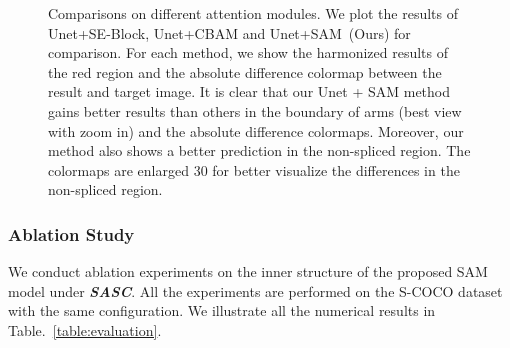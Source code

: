 \begin{figure}[h]
\centering   
{}

\par\bigskip\vspace*{-2em}


\par\bigskip\vspace*{-2em}
\addtocounter{subfigure}{-3}


\caption{Comparisons on different attention modules. We plot the results of Unet+SE-Block, Unet+CBAM and Unet+SAM~(Ours) for comparison. For each method, we show the harmonized results of the red region and the absolute difference colormap between the result and target image. It is clear that our Unet + SAM method gains better results than others in the boundary of arms (best view with zoom in) and the absolute difference colormaps. Moreover, our method also shows a better prediction in the non-spliced region. The colormaps are enlarged 30 for better visualize the differences in the non-spliced region.}
\label{fig:attentionmodule}
\vspace{-1.5em}
\end{figure}
 

\subsubsection{Ablation Study}
\label{sec:astudy}
We conduct ablation experiments on the inner structure of the proposed SAM model under \textit{\textbf{SASC}}. All the experiments are performed on the S-COCO dataset with the same configuration. We illustrate all the numerical results in Table.~\ref{table:evaluation}.

